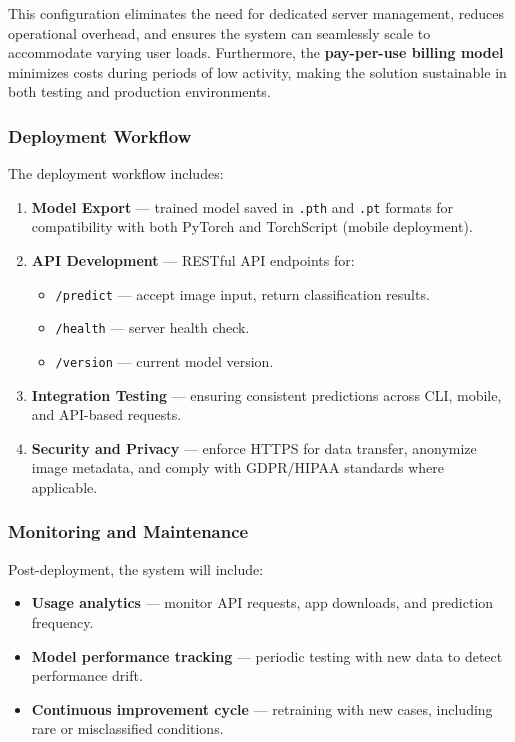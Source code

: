 \documentclass[
  12pt,
  oneside]{article}
\providecommand{\tightlist}{%
  \setlength{\itemsep}{0pt}\setlength{\parskip}{0pt}}
\begin{document}
This configuration eliminates the need for dedicated server management,
reduces operational overhead, and ensures the system can seamlessly
scale to accommodate varying user loads. Furthermore, the
\textbf{pay-per-use billing model} minimizes costs during periods of low
activity, making the solution sustainable in both testing and production
environments.

\subsubsection{Deployment Workflow}\label{deployment-workflow}

The deployment workflow includes:

\begin{enumerate}
\def\labelenumi{\arabic{enumi}.}
\item
  \textbf{Model Export} --- trained model saved in \texttt{.pth} and
  \texttt{.pt} formats for compatibility with both PyTorch and
  TorchScript (mobile deployment).
\item
  \textbf{API Development} --- RESTful API endpoints for:

  \begin{itemize}
  \tightlist
  \item
    \texttt{/predict} --- accept image input, return classification
    results.
  \item
    \texttt{/health} --- server health check.
  \item
    \texttt{/version} --- current model version.
  \end{itemize}
\item
  \textbf{Integration Testing} --- ensuring consistent predictions
  across CLI, mobile, and API-based requests.
\item
  \textbf{Security and Privacy} --- enforce HTTPS for data transfer,
  anonymize image metadata, and comply with GDPR/HIPAA standards where
  applicable.
\end{enumerate}

\subsubsection{Monitoring and
Maintenance}\label{monitoring-and-maintenance}

Post-deployment, the system will include:

\begin{itemize}
\tightlist
\item
  \textbf{Usage analytics} --- monitor API requests, app downloads, and
  prediction frequency.
\item
  \textbf{Model performance tracking} --- periodic testing with new data
  to detect performance drift.
\item
  \textbf{Continuous improvement cycle} --- retraining with new cases,
  including rare or misclassified conditions.
\end{itemize}
\end{document}

